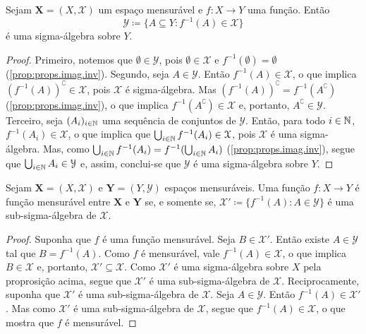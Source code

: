 \begin{prop}
	Sejam $\bm X = (X,\mathcal X)$ um espaço mensurável e $f: X \to Y$ uma função. Então
	\begin{equation*}
	\mathcal Y \coloneqq \{A \subseteq Y : f^{-1}(A) \in \mathcal X\}
	\end{equation*}
é uma sigma-álgebra sobre $Y$.
\end{prop}
\begin{proof}
	Primeiro, notemos que $\emptyset \in \mathcal Y$, pois $\emptyset \in \mathcal X$ e $f^{-1}(\emptyset) = \emptyset$ (\ref{prop:props.imag.inv}). Segundo, seja $A \in \mathcal Y$. Então $f^{-1}(A) \in \mathcal X$, o que implica $(f^{-1}(A))^\complement \in \mathcal X$, pois $\mathcal X$ é sigma-álgebra. Mas $(f^{-1}(A))^\complement = f^{-1}(A^\complement)$ (\ref{prop:props.imag.inv}), o que implica $f^{-1}(A^\complement) \in \mathcal X$ e, portanto, $A^\complement \in \mathcal Y$. Terceiro, seja $(A_i)_{i \in \mathbb{N}}$ uma sequência de conjuntos de $\mathcal Y$. Então, para todo $i \in \mathbb{N}$, $f^{-1}(A_i) \in \mathcal X$, o que implica que $\bigcup_{i \in \mathbb{N}} f^{-1}(A_i) \in \mathcal X$, pois $\mathcal X$ é uma sigma-álgebra. Mas, como $\bigcup_{i \in \mathbb{N}} f^{-1}(A_i) = f^{-1}(\bigcup_{i \in \mathbb{N}} A_i)$ (\ref{prop:props.imag.inv}), segue que $\bigcup_{i \in \mathbb{N}} A_i \in \mathcal Y$ e, assim, conclui-se que $\mathcal Y$ é uma sigma-álgebra sobre $Y$.
\end{proof}

\begin{prop}
	Sejam $\bm X = (X,\mathcal X)$ e $\bm Y = (Y,\mathcal Y)$ espaços mensuráveis. Uma função $f: X \to Y$ é função mensurável entre $\bm X$ e $\bm Y$ se, e somente se, $\mathcal X' \coloneqq \{f^{-1}(A) : A \in \mathcal Y\}$ é uma sub-sigma-álgebra de $\mathcal X$.
\end{prop}
\begin{proof}
	Suponha que $f$ é uma função mensurável. Seja $B \in \mathcal X'$. Então existe $A \in \mathcal Y$ tal que $B = f^{-1}(A)$. Como $f$ é mensurável, vale $f^{-1}(A) \in \mathcal X$, o que implica $B \in \mathcal X$ e, portanto, $\mathcal X' \subseteq \mathcal X$. Como $\mathcal X'$ é uma sigma-álgebra sobre $X$ pela proprosição acima, segue que $\mathcal X'$ é uma sub-sigma-álgebra de $\mathcal X$. Reciprocamente, suponha que $\mathcal X'$ é uma sub-sigma-álgebra de $\mathcal X$. Seja $A \in \mathcal Y$. Então $f^{-1}(A) \in \mathcal X'$. Mas como $\mathcal X'$ é uma sub-sigma-álgebra de $\mathcal X$, segue que $f^{-1}(A) \in \mathcal X$, o que mostra que $f$ é mensurável. 
\end{proof}

